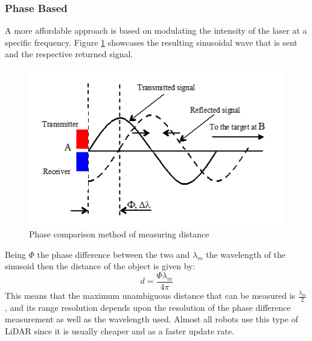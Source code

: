 \subsubsection*{Phase Based}
A more affordable approach  is based on modulating the intensity of the laser at a specific frequency. Figure \ref{fig:cwlidar1} showcases the resulting sinusoidal wave that is sent and the respective returned signal. 
\begin{figure}[h] 
\centerline{\includegraphics [width=0.7 \textwidth]{imgs/chapter2/cwlidar1.png}}
\caption{Phase comparison method of measuring distance \cite{cwlidar}}
\label{fig:cwlidar1}
\end{figure}

Being $\Phi$ the phase difference between the two and $\lambda_m$ the wavelength of the sinusoid then the distance of the object is given by:
\begin{equation}
    d=\frac{\Phi \lambda_m}{4 \pi}
\end{equation}
This means that the maximum unambiguous distance that can be measured is  $\frac{\lambda_m}{2}$, and its range resolution depends upon the resolution of the phase difference measurement as well as the wavelength used. Almost all robots use this type of \ac{LiDAR} since it is usually cheaper and as a faster update rate.

